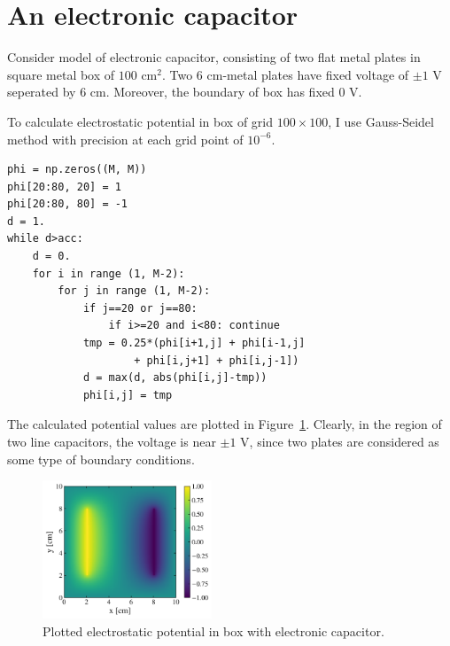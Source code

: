 \documentclass[reprint, nofootinbib]{revtex4-2} %
\begin{document}
\section{An electronic capacitor}
Consider model of electronic capacitor, consisting of two flat metal plates in square metal box of $100$ cm$^2$. Two $6$ cm-metal plates have fixed voltage of $\pm 1$ V seperated by $6$ cm. Moreover, the boundary of box has fixed $0$ V.

To calculate electrostatic potential in box of grid $100\times100$, I use Gauss-Seidel method with precision at each grid point of $10^{-6}$.

\begin{Verbatim}[tabsize=3]
phi = np.zeros((M, M))
phi[20:80, 20] = 1
phi[20:80, 80] = -1
d = 1.
while d>acc:
	d = 0.
	for i in range (1, M-2):
		for j in range (1, M-2):
			if j==20 or j==80:
				if i>=20 and i<80: continue
			tmp = 0.25*(phi[i+1,j] + phi[i-1,j] 
					+ phi[i,j+1] + phi[i,j-1])
			d = max(d, abs(phi[i,j]-tmp))
			phi[i,j] = tmp
\end{Verbatim}

The calculated potential values are plotted in Figure~\ref{fig:fin2}. Clearly, in the region of two line capacitors, the voltage is near $\pm 1$ V, since two plates are considered as some type of boundary conditions.

\begin{figure}[t]
	\includegraphics[width=0.45\textwidth]{fin_2}
	\caption{Plotted electrostatic potential in box with electronic capacitor.}
	\label{fig:fin2}
\end{figure}
\end{document}
